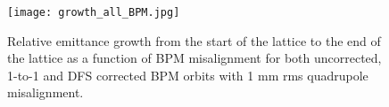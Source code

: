 \documentclass[12pt,a4paper,english]{article}
\begin{document}
\begin{figure}[t!]
	\centering\texttt{[image: growth\_all\_BPM.jpg]}
	\caption{Relative emittance growth from the start of the lattice to the end of the lattice as a function of BPM misalignment for both uncorrected, 1-to-1 and DFS corrected BPM orbits with 1 mm rms quadrupole misalignment. \label{fig:em_growth_all}}
\end{figure} 
\end{document}
